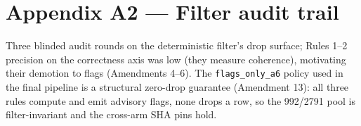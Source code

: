 

\section*{Appendix A2 --- Filter audit trail}

Three blinded audit rounds on the deterministic filter's drop surface;
Rules 1--2 precision on the correctness axis was low (they measure
coherence), motivating their demotion to flags (Amendments 4--6). The
\texttt{flags\_only\_a6} policy used in the final pipeline is a structural
zero-drop guarantee (Amendment 13): all three rules compute and emit
advisory flags, none drops a row, so the 992/2791 pool is
filter-invariant and the cross-arm SHA pins hold.
